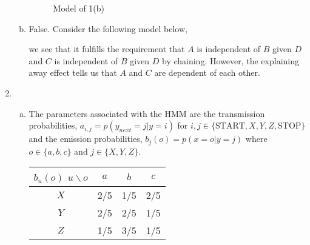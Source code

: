 \documentclass[a4paper,10pt]{article}
\theoremstyle{definition}
\begin{document}
\begin{enumerate}
\begin{enumerate}[(a)]
\begin{figure}[h]
\centering
{}
\caption{Model of 1(b)}
\end{figure}


\item False. Consider the following model below,
\begin{figure}[h]
\centering
{}
\end{figure}
we see that it fulfills the requirement that $A$ is independent of $B$ given $D$ and $C$ is independent of $B$ given $D$ by chaining. However, the explaining away effect tells us that $A$ and $C$ are dependent of each other.

\end{enumerate}
\newpage
\item
\begin{enumerate}[(a)]
\item The parameters associated with the HMM are the transmission probabilities, $a_{i,j} = p(y_{next}=j|y=i)$ for $i,j \in \{\text{START}, X,Y,Z, \text{STOP}\}$ and the emission probabilities, $b_{j}(o)=p(x=o|y=j)$ where $o \in \{a, b, c\}$ and $j \in \{X, Y, Z\}$.

\begin{table}[h]
\centering
\begin{tabular}{c|c|c|c}
$b_u(o)$ $u \backslash o$ &$a$ & $b$ & $c$\\
\hline
$X$ &2/5 & 1/5& 2/5\\
\hline
$Y$&2/5 &2/5 & 1/5 \\
\hline
$Z$ &1/5 &3/5 & 1/5\\
\hline
\end{tabular}
\end{table}


\end{enumerate}
\end{enumerate}
\end{document}

